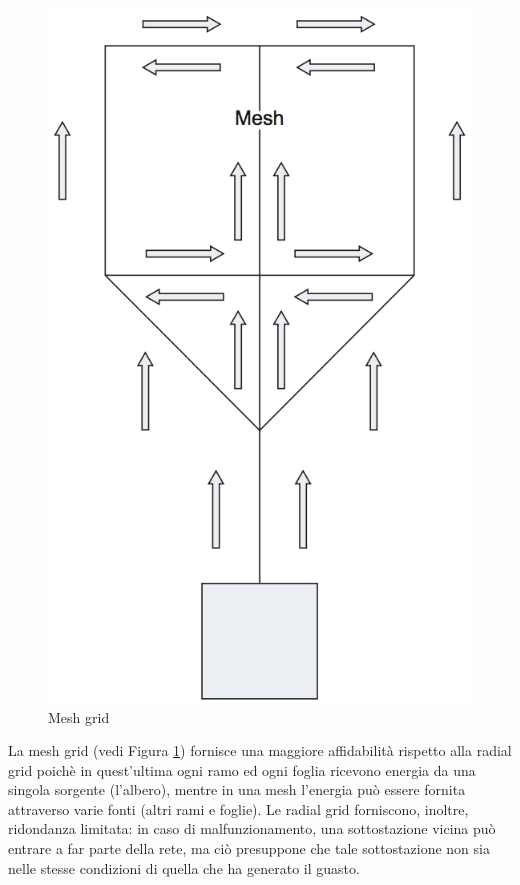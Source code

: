 \begin{figure}[!tbp]
\begin{minipage}[b]{0.4\textwidth}
  \includegraphics[scale=0.15, natwidth=529,natheight=867]{imgs/meshgrid.png}
  \caption{Mesh grid}\label{fig:3}
  \end{minipage}
\end{figure}
La mesh grid (vedi Figura \ref{fig:3}) fornisce una maggiore affidabilità rispetto alla radial grid poichè in quest'ultima ogni ramo ed ogni foglia ricevono energia da una singola sorgente (l'albero), mentre in una mesh l'energia può essere fornita attraverso varie fonti (altri rami e foglie). \newline
Le radial grid forniscono, inoltre, ridondanza limitata: in caso di malfunzionamento, una sottostazione vicina può entrare a far parte della rete, ma ciò presuppone che tale sottostazione non sia nelle stesse condizioni di quella che ha generato il guasto. \newline
